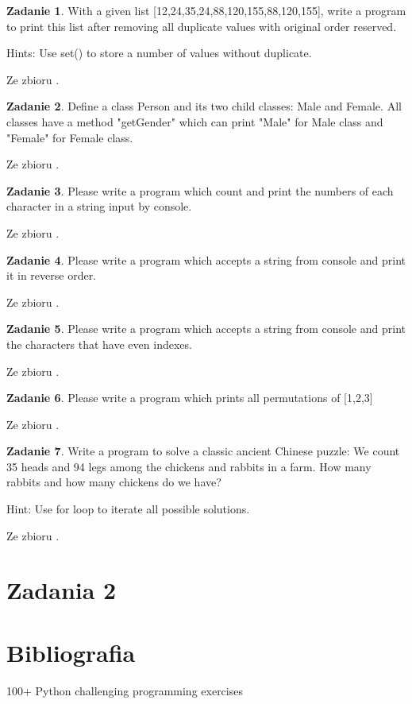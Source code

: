\documentclass[11pt]{article}
\theoremstyle{definition}
\newtheorem{zadanie}{Zadanie}
\newcommand{\fromA}{\small Ze zbioru \cite{python100}.}
\begin{document}
\begin{zadanie}
With a given list [12,24,35,24,88,120,155,88,120,155], write a program to print this list after removing all duplicate values with original order reserved.

Hints:
Use set() to store a number of values without duplicate.

\fromA
\end{zadanie}
\begin{zadanie}
Define a class Person and its two child classes: Male and Female. All classes have a method "getGender" which can print "Male" for Male class and "Female" for Female class.

\fromA
\end{zadanie}
\begin{zadanie}
Please write a program which count and print the numbers of each character in a string input by console.

\fromA
\end{zadanie}
\begin{zadanie}
Please write a program which accepts a string from console and print it in reverse order.

\fromA
\end{zadanie}
\begin{zadanie}
Please write a program which accepts a string from console and print the characters that have even indexes.

\fromA
\end{zadanie}
\begin{zadanie}
Please write a program which prints all permutations of [1,2,3]

\fromA
\end{zadanie}
\begin{zadanie}
Write a program to solve a classic ancient Chinese puzzle: 
We count 35 heads and 94 legs among the chickens and rabbits in a farm. How many rabbits and how many chickens do we have?

Hint:
Use for loop to iterate all possible solutions.

\fromA
\end{zadanie}

\section{Zadania 2}


\section{Bibliografia}
\begin{thebibliography}{9}

 100+ Python challenging programming exercises
\end{thebibliography}
\end{document}

